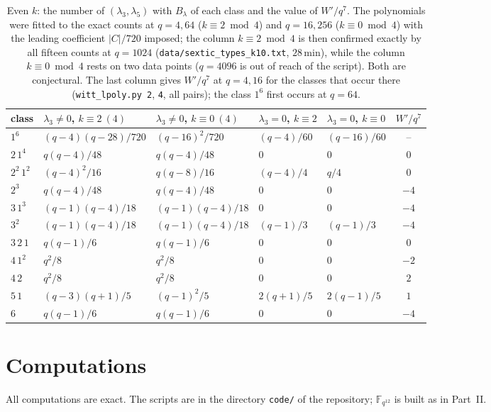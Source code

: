 \documentclass[12pt,a4paper]{amsart}
\theoremstyle{definition}
\newcommand{\F}{\mathbb{F}}
\begin{document}
\begin{table}[H]
\centering
\caption{Even $k$: the number of $(\lambda_3,\lambda_5)$ with $B_\lambda$ of each class and the value of $W'/q^7$. The polynomials were fitted to the exact counts at $q=4,64$ ($k\equiv2\bmod4$) and $q=16,256$ ($k\equiv0\bmod4$) with the leading coefficient $|C|/720$ imposed; the column $k\equiv2\bmod4$ is then confirmed exactly by all fifteen counts at $q=1024$ (\texttt{data/sextic\_types\_k10.txt}, $28$\,min), while the column $k\equiv0\bmod4$ rests on two data points ($q=4096$ is out of reach of the script). Both are conjectural. The last column gives $W'/q^7$ at $q=4,16$ for the classes that occur there (\texttt{witt\_lpoly.py 2}, \texttt{4}, all pairs); the class $1^6$ first occurs at $q=64$.}\label{tab:evenk}
\small
\begin{tabular}{@{}lllllc@{}}
\toprule
class & $\lambda_3\ne0$, $k\equiv2\ (4)$ & $\lambda_3\ne0$, $k\equiv0\ (4)$ & $\lambda_3=0$, $k\equiv2$ & $\lambda_3=0$, $k\equiv0$ & $W'/q^7$\\
\midrule
$1^6$ & $(q-4)(q-28)/720$ & $(q-16)^2/720$ & $(q-4)/60$ & $(q-16)/60$ & --\\
$2\,1^4$ & $q(q-4)/48$ & $q(q-4)/48$ & $0$ & $0$ & $0$\\
$2^2\,1^2$ & $(q-4)^2/16$ & $q(q-8)/16$ & $(q-4)/4$ & $q/4$ & $0$\\
$2^3$ & $q(q-4)/48$ & $q(q-4)/48$ & $0$ & $0$ & $-4$\\
$3\,1^3$ & $(q-1)(q-4)/18$ & $(q-1)(q-4)/18$ & $0$ & $0$ & $-4$\\
$3^2$ & $(q-1)(q-4)/18$ & $(q-1)(q-4)/18$ & $(q-1)/3$ & $(q-1)/3$ & $-4$\\
$3\,2\,1$ & $q(q-1)/6$ & $q(q-1)/6$ & $0$ & $0$ & $0$\\
$4\,1^2$ & $q^2/8$ & $q^2/8$ & $0$ & $0$ & $-2$\\
$4\,2$ & $q^2/8$ & $q^2/8$ & $0$ & $0$ & $2$\\
$5\,1$ & $(q-3)(q+1)/5$ & $(q-1)^2/5$ & $2(q+1)/5$ & $2(q-1)/5$ & $1$\\
$6$ & $q(q-1)/6$ & $q(q-1)/6$ & $0$ & $0$ & $-4$\\
\bottomrule
\end{tabular}
\end{table}

\section{Computations}\label{sec:numerics}
All computations are exact. The scripts are in the directory \texttt{code/} of the repository; $\F_{q^{12}}$ is built as in Part~II.
\end{document}
